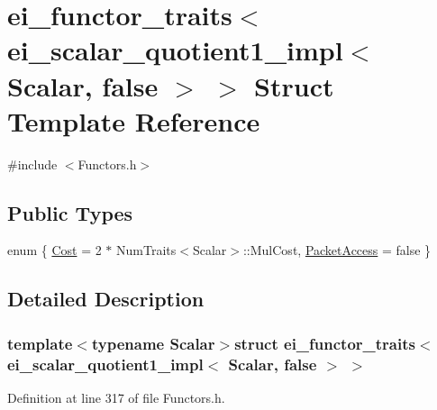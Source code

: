 \hypertarget{structei__functor__traits_3_01ei__scalar__quotient1__impl_3_01_scalar_00_01false_01_4_01_4}{\section{ei\-\_\-functor\-\_\-traits$<$ ei\-\_\-scalar\-\_\-quotient1\-\_\-impl$<$ Scalar, false $>$ $>$ Struct Template Reference}
\label{structei__functor__traits_3_01ei__scalar__quotient1__impl_3_01_scalar_00_01false_01_4_01_4}
}


{\ttfamily \#include $<$Functors.\-h$>$}

\subsection*{Public Types}
\begin{DoxyCompactItemize}
\item 
enum \{ \hyperlink{structei__functor__traits_3_01ei__scalar__quotient1__impl_3_01_scalar_00_01false_01_4_01_4_aae8d5ba1512ffbcc85c86bc75b5d8657a5bef9226a713dc3225617e2400e7cfa5}{Cost} = 2 $\ast$ Num\-Traits$<$Scalar$>$\-:\-:Mul\-Cost, 
\hyperlink{structei__functor__traits_3_01ei__scalar__quotient1__impl_3_01_scalar_00_01false_01_4_01_4_aae8d5ba1512ffbcc85c86bc75b5d8657a5b8006ae15f08a3906d07b8ec92565df}{Packet\-Access} = false
 \}
\end{DoxyCompactItemize}


\subsection{Detailed Description}
\subsubsection*{template$<$typename Scalar$>$struct ei\-\_\-functor\-\_\-traits$<$ ei\-\_\-scalar\-\_\-quotient1\-\_\-impl$<$ Scalar, false $>$ $>$}



Definition at line 317 of file Functors.\-h.



